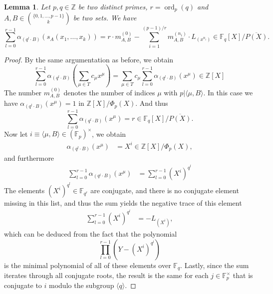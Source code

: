 \documentclass[a4paper]{article}
\newcommand{\Z}{\ensuremath{\mathbb{Z}}}
\newcommand{\F}{\mathbb{F}}
\newcommand{\ord}{\operatorname{ord}}
\newtheorem{lemma}[theorem]{Lemma}
\numberwithin{equation}{section}
\numberwithin{table}{section}
\numberwithin{figure}{section}
\begin{document}
\begin{lemma}\label{lemmanonprim}
    Let $p,q\in \Z$ be two distinct primes, $r=\ord_p(q)$ and $A,B \in \binom{\{0,1,\ldots,p-1\}}{k}$ be two sets.
    We have
    \[
    \sum_{l=0}^{r-1}\alpha_{(q^l \cdot B)}(s_A(x_1,\ldots,x_k)) =r \cdot m^{(0)}_{A,B} - \sum_{i=1}^{(p-1)/r}m^{(n_i)}_{A,B} \cdot L_{(x^{n_i})} \in \F_q[X]/\overline{P(X)}.
    \]
\end{lemma}

\begin{proof}
    By the same argumentation as before, we obtain
    \[
    \sum_{l=0}^{r-1}\alpha_{(q^l\cdot B)}\left(\sum_{\mu \in T} c_\mu x^\mu \right)= \sum_{\mu \in T} c_\mu \sum_{l=0}^{r-1}\alpha_{(q^l\cdot B)}(x^\mu) \in \Z[X]
    \]
    The number $m^{(0)}_{A,B}$ denotes the number of indices $\mu$ with $p | \langle \mu,B\rangle$. In this case we have 
    $\alpha_{(q^l\cdot B)}(x^\mu) = 1$
    in $\Z[X]/\Phi_p(X)$. And thus
    \[
    \sum_{l=0}^{r-1}\alpha_{(q^l\cdot B)}(x^\mu)=r \in \F_q[X]/\overline{P(X)}.
    \]
    Now let $i \equiv \langle \mu, B\rangle \in (\F_p)^\times$, we obtain
    \begin{align}
        \alpha_{(q^l\cdot B)}(x^\mu) &= X^i \in \Z[X]/\Phi_p(X),
    \end{align}
    and furthermore
    \begin{align*}
        \sum_{l=0}^{r-1}\alpha_{(q^l\cdot B)}(x^\mu)&=\sum_{l=0}^{r-1}(X^{i})^{q^l}
    \end{align*}
    The elements $(X^{i})^{q^l} \in \F_{q^r}$ are conjugate, and there is no conjugate element missing in this list, and thus the sum yields the negative trace of this element
    \begin{align*}
        \sum_{l=0}^{r-1}(X^{i})^{q^l} &= - L_{(X^i)},
    \end{align*}
    which can be deduced from the fact that the polynomial
    \[
    \prod_{l=0}^{r-1}(Y-(X^i)^{q^l})
    \]
    is the minimal polynomial of all of these elements over $\F_q$. Lastly, since the sum iterates through all conjugate roots, the result is the same for each $j \in \F_p^\times$ that is conjugate to $i$ modulo the subgroup $\langle q \rangle$.
\end{proof}
\end{document}
